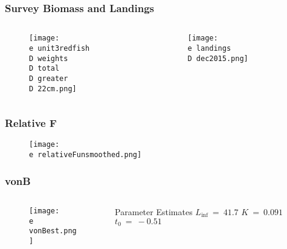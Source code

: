 \documentclass{beamer}
\begin{document}
\begin{frame}
\frametitle{Survey Biomass and Landings}
\begin{columns}
	\begin{column}{.48\textwidth}
		\begin{figure}
		\centerline{\texttt{[image: \\e unit3redfish\\D weights\\D total\\D greater\\D 22cm.png]}}
		\end{figure}
	\end{column}

	\begin{column}{0.48\textwidth}
	\begin{figure}

 		\centerline{\texttt{[image: \\e landings\\D dec2015.png]}}

 \end{figure}
	 \end{column}
 \end{columns}
\end{frame}


\begin{frame}
\frametitle{Relative F}

\begin{figure}
\centering
 \centerline{\texttt{[image: \\e relativeFunsmoothed.png]}}

 \end{figure}
 \end{frame}



\begin{frame}
\frametitle{vonB}

\begin{columns}
\begin{column}{0.75\textwidth}
\begin{figure}
\centering
    \texttt{[image: \\e vonBest.png]}

%
\end{figure}
\end{column}
%
\begin{column}{0.25\textwidth}
\begin{block}{Parameter Estimates}
\centering
		$ L_{\inf} \ = \ 41.7 $ 
		$K\ =\ 0.091 $
		$t_{0}\ =\ -0.51	$
\end{block}
\end{column}

\end{columns}
%
 \end{frame}
%
\end{document}
